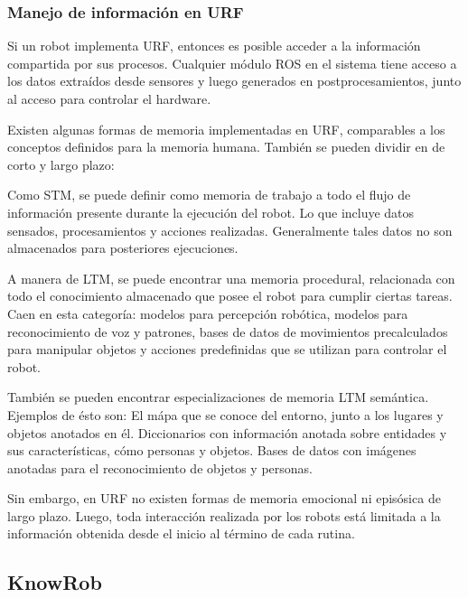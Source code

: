 

\subsubsection{Manejo de informaci\'on en URF}

Si un robot implementa URF, entonces es posible acceder a la informaci\'on compartida por sus procesos. Cualquier m\'odulo ROS en el sistema tiene acceso a los datos extra\'idos desde sensores y luego generados en postprocesamientos, junto al acceso para controlar el hardware.

Existen algunas formas de memoria implementadas en URF, comparables a los conceptos definidos para la memoria humana. Tambi\'en se pueden dividir en de corto y largo plazo:

Como STM, se puede definir como memoria de trabajo a todo el flujo de informaci\'on presente durante la ejecuci\'on del robot. Lo que incluye datos sensados, procesamientos y acciones realizadas. Generalmente tales datos no son almacenados para posteriores ejecuciones.

A manera de LTM, se puede encontrar una memoria procedural, relacionada con todo el conocimiento almacenado que posee el robot para cumplir ciertas tareas. Caen en esta categor\'ia: modelos para percepci\'on rob\'otica, modelos para reconocimiento de voz y patrones, bases de datos de movimientos precalculados para manipular objetos y acciones predefinidas que se utilizan para controlar el robot.

Tambi\'en se pueden encontrar especializaciones de memoria LTM sem\'antica. Ejemplos de \'esto son: El m\'apa que se conoce del entorno, junto a los lugares y objetos anotados en \'el. Diccionarios con informaci\'on anotada sobre entidades y sus caracter\'isticas, c\'omo personas y objetos. Bases de datos con im\'agenes anotadas para el reconocimiento de objetos y personas. 

Sin embargo, en URF no existen formas de memoria emocional ni epis\'osica de largo plazo. Luego, toda interacci\'on realizada por los robots est\'a limitada a la informaci\'on obtenida desde el inicio al t\'ermino de cada rutina.



\subsection{KnowRob}

